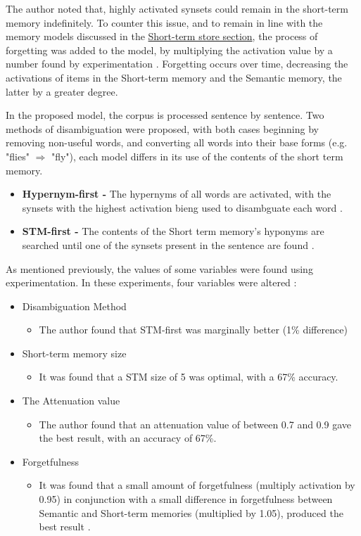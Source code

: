 \documentclass[]{article}
\begin{document}
The author noted that, highly activated synsets could remain in the short-term memory indefinitely. To counter this issue, and to remain in line with the memory models discussed in the \hyperref[ShortTerm]{Short-term store section}, the process of forgetting was added to the model, by multiplying the activation value by a number found by experimentation \cite{MattBurkePrevious}. Forgetting occurs over time, decreasing the activations of items in the Short-term memory and the Semantic memory, the latter by a greater degree.

In the proposed model, the corpus is processed sentence by sentence. Two methods of disambiguation were proposed, with both cases beginning by removing non-useful words, and converting all words into their base forms (e.g. "flies" $\Rightarrow$ "fly"), each model differs in its use of the contents of the short term memory.
\begin{itemize}
	\item[] \textbf{Hypernym-first - } The hypernyms of all words are activated, with the synsets with the highest activation bieng used to disambguate each word \cite{MattBurkePrevious}.
	\item[] \textbf{STM-first - } The contents of the Short term memory's hyponyms are searched until one of the synsets present in the sentence are found \cite{MattBurkePrevious}.
\end{itemize}


As mentioned previously, the values of some variables were found using experimentation. In these experiments, four variables were altered \cite{MattBurkePrevious}:
\begin{itemize}
	\item Disambiguation Method
	\begin{itemize}
		\item[] The author found that STM-first was marginally better (1\% difference)
	\end{itemize}
	\item Short-term memory size
	\begin{itemize}
		\item[] It was found that a STM size of 5 was optimal, with a 67\% accuracy.
	\end{itemize}
	\item The Attenuation value
	\begin{itemize}
		\item[] The author found that an attenuation value of between 0.7 and 0.9 gave the best result, with an accuracy of 67\%.
	\end{itemize}
	\item Forgetfulness
	\begin{itemize}
		\item[] It was found that a small amount of forgetfulness (multiply activation by 0.95) in conjunction with a small difference in forgetfulness between Semantic and Short-term memories (multiplied by 1.05), produced the best result \cite{MattBurkePrevious}.
	\end{itemize}
\end{itemize}
\end{document}
